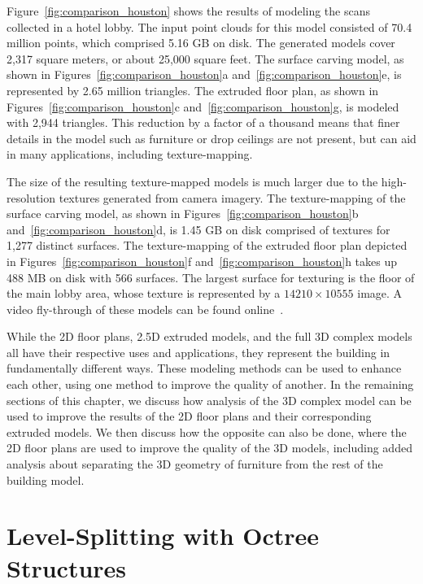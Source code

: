 \documentclass[12pt,onecolumn,oneside]{book}
\begin{document}
Figure~\ref{fig:comparison_houston} shows the results of modeling the scans collected in a hotel lobby.  The input point clouds for this model consisted of 70.4 million points, which comprised 5.16 GB on disk.  The generated models cover 2,317 square meters, or about 25,000 square feet.  The surface carving model, as shown in Figures~\ref{fig:comparison_houston}a and~\ref{fig:comparison_houston}e, is represented by 2.65 million triangles.  The extruded floor plan, as shown in Figures~\ref{fig:comparison_houston}c and~\ref{fig:comparison_houston}g, is modeled with 2,944 triangles.  This reduction by a factor of a thousand means that finer details in the model such as furniture or drop ceilings are not present, but can aid in many applications, including texture-mapping.

The size of the resulting texture-mapped models is much larger due to the high-resolution textures generated from camera imagery.  The texture-mapping of the surface carving model, as shown in Figures~\ref{fig:comparison_houston}b and~\ref{fig:comparison_houston}d, is 1.45 GB on disk comprised of textures for 1,277 distinct surfaces.  The texture-mapping of the extruded floor plan depicted in Figures~\ref{fig:comparison_houston}f and~\ref{fig:comparison_houston}h takes up 488 MB on disk with 566 surfaces.  The largest surface for texturing is the floor of the main lobby area, whose texture is represented by a $14210 \times 10555$ image.  A video fly-through of these models can be found online~\cite{video}.

While the 2D floor plans, 2.5D extruded models, and the full 3D complex models all have their respective uses and applications, they represent the building in fundamentally different ways.  These modeling methods can be used to enhance each other, using one method to improve the quality of another.  In the remaining sections of this chapter, we discuss how analysis of the 3D complex model can be used to improve the results of the 2D floor plans and their corresponding extruded models.  We then discuss how the opposite can also be done, where the 2D floor plans are used to improve the quality of the 3D models, including added analysis about separating the 3D geometry of furniture from the rest of the building model.

\section{Level-Splitting with Octree Structures}
\label{sec:octree_level_split}
\end{document}
